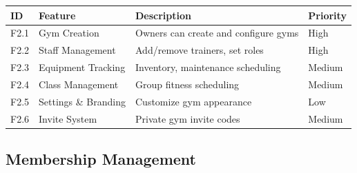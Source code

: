 \documentclass[
  12pt,
  a4paperpaper,
]{report}
\newcounter{none} %
\begin{document}
{\def\LTcaptype{none} %
\begin{longtable}[]{@{}
  >{\raggedright\arraybackslash}p{}
  >{\raggedright\arraybackslash}p{}
  >{\raggedright\arraybackslash}p{}
  >{\raggedright\arraybackslash}p{}@{}}
\hline
\begin{minipage}[b]{\linewidth}\raggedright
ID
\end{minipage} & \begin{minipage}[b]{\linewidth}\raggedright
Feature
\end{minipage} & \begin{minipage}[b]{\linewidth}\raggedright
Description
\end{minipage} & \begin{minipage}[b]{\linewidth}\raggedright
Priority
\end{minipage} \\
\hline
\endhead
\hline
\endlastfoot
F2.1 & Gym Creation & Owners can create and configure gyms & High \\
F2.2 & Staff Management & Add/remove trainers, set roles & High \\
F2.3 & Equipment Tracking & Inventory, maintenance scheduling &
Medium \\
F2.4 & Class Management & Group fitness scheduling & Medium \\
F2.5 & Settings \& Branding & Customize gym appearance & Low \\
F2.6 & Invite System & Private gym invite codes & Medium \\
\end{longtable}
}

\subsection{Membership Management}\label{membership-management-1}
\end{document}
